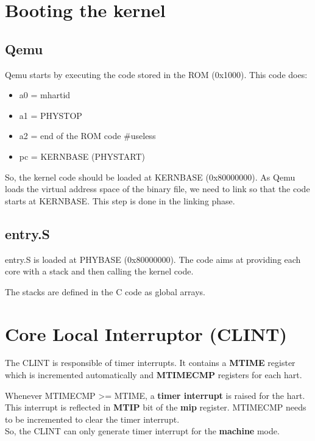 \documentclass[10pt, a4paper]{article}
\begin{document}
\section{Booting the kernel}
\subsection{Qemu}

Qemu starts by executing the code stored in the ROM (0x1000).
This code does:
\begin{itemize}
\item a0 = mhartid
\item a1 = PHYSTOP
\item a2 = end of the ROM code \#useless
\item pc = KERNBASE (PHYSTART)
\end{itemize}

So, the kernel code should be loaded at KERNBASE (0x80000000). As Qemu loads the virtual address space of the binary file, we need to link so that the code starts at KERNBASE. This step is done in the linking phase.

\subsection{entry.S}

entry.S is loaded at PHYBASE (0x80000000).
The code aims at providing each core with a stack and then calling the kernel code.

The stacks are defined in the C code as global arrays.

\section{Core Local Interruptor (CLINT)}

The CLINT is responsible of timer interrupts. It contains a \textbf{MTIME} register which is incremented automatically and \textbf{MTIMECMP} registers for each hart.

Whenever MTIMECMP >= MTIME, a \textbf{timer interrupt} is raised for the hart. This interrupt is reflected in \textbf{MTIP} bit of the \textbf{mip} register.
MTIMECMP needs to be incremented to clear the timer interrupt.\\

So, the CLINT can only generate timer interrupt for the \textbf{machine} mode.\\

\noindent {}\\
\noindent {}
\end{document}
